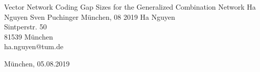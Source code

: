 \documentclass{CODthesis}
\theoremstyle{definition}
\theoremstyle{plain}
\theoremstyle{remark}
\theoremstyle{plain}
\theoremstyle{definition}
\theoremstyle{plain}
\theoremstyle{plain}
\begin{document}
    {Vector Network Coding Gap Sizes for the Generalized Combination Network}                  %
    {Ha Nguyen}                  %
    {Sven Puchinger}            %
    {M\"unchen, 08 2019}          %
    {Ha Nguyen\\                 %
    Sintperstr. 50\\
    81539 M\"unchen\\
    ha.nguyen@tum.de}

    {M\"unchen, 05.08.2019}         %

\cleardoubleemptypage   %


    \setcounter{page}{1}

        \tableofcontents    %
        \listoffigures      %
        \listoftables       %
        \cleardoubleemptypage   %


    \setcounter{page}{1}

	
	
	
	
    
    
      
       
        
        \cleardoubleemptypage



    \appendix
    \setcounter{page}{1}

        
        
\end{document}
